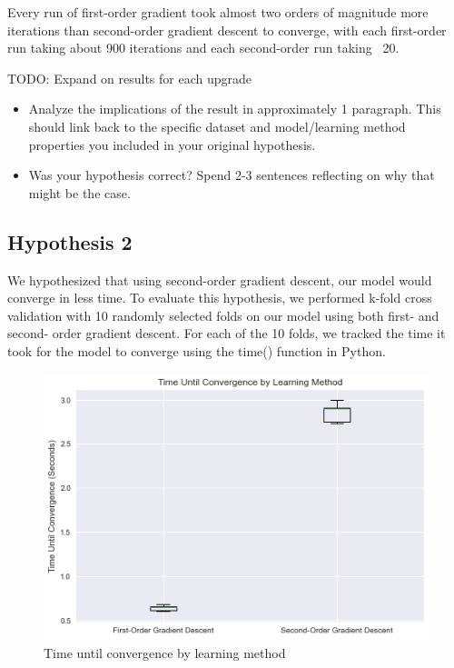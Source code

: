 \documentclass[11pt]{extarticle}
\begin{document}
Every run of first-order gradient took almost two orders of magnitude more iterations than second-order gradient descent to converge, with each first-order run taking about 900 iterations and each second-order run taking ~20.

TODO: Expand on results for each upgrade

\begin{itemize}
 \item Analyze the implications of the result in approximately 1 paragraph.  This should link back to the specific dataset and model/learning method properties you included in your original hypothesis.  
 \item Was your hypothesis correct?  Spend 2-3 sentences reflecting on why that might be the case.
\end{itemize}


\newpage

\subsection{Hypothesis 2}

We hypothesized that using second-order gradient descent, our model would converge in less time. To evaluate this hypothesis, we performed k-fold cross validation with 10 randomly selected folds on our model using both first- and second- order gradient descent. For each of the 10 folds, we tracked the time it took for the model to converge using the time() function in Python.

\begin{figure}[h!]
\begin{center}
    \includegraphics[scale=.7]{time.png}
	\caption{Time until convergence by learning method}    
    \label{fig:x}
\end{center}
\end{figure}
\end{document}
